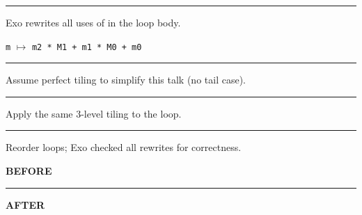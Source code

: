 \newpage
{}

{\large

}

\vspace{3mm}
\hrule

{\LARGE
Exo rewrites all uses of  in the loop body.

\texttt{m} $\mapsto$ \texttt{m2 * M1 + m1 * M0 + m0}

}

\newpage
{}

{\large

}

\vspace{3mm}
\hrule

{\LARGE
Assume perfect tiling to simplify this talk (no tail case).

}

\newpage
{}

{\large

}

\vspace{3mm}
\hrule

{\LARGE
Apply the same 3-level tiling to the  loop.

}

\newpage
{}

{\large

}

\vspace{3mm}
\hrule

{\LARGE
Reorder loops; Exo checked all rewrites for correctness.

}

\newpage
{\large
\textbf{\LARGE BEFORE}\\

}

\vspace{1mm}
\hrule

{\large
\textbf{\LARGE AFTER}\\

}

\newpage
{}

